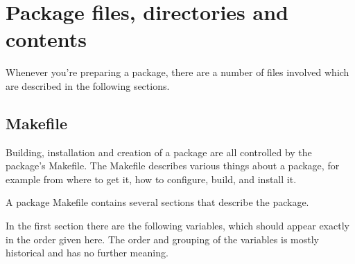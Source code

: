 %
%
%
%
%
\section{Package files, directories and contents} %
\label{section:pkgvars}

Whenever you're preparing a package, there are a number of files involved which
are described in the following sections.

\subsection{Makefile} %
\label{subsection:makefile}

Building, installation and creation of a package are all controlled by the
package's Makefile. The Makefile describes various things about a package,
for example from where to get it, how to configure, build, and install it.

A package Makefile contains several sections that describe the package.

In the first section there are the following variables, which should appear
exactly in the order given here. The order and grouping of the variables is
mostly historical and has no further meaning.

